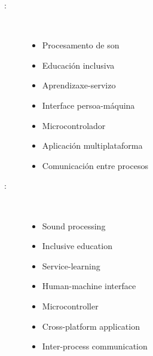 \begin{multicols}{2}
\begin{description}
\item [\palabraschaveprincipal:] \mbox{} \\[-20pt]
  \begin{itemize}
    \item Procesamento de son
    \item Educación inclusiva
    \item Aprendizaxe-servizo
    \item Interface persoa-máquina
    \item Microcontrolador
    \item Aplicación multiplataforma
    \item Comunicación entre procesos
  \end{itemize}
\end{description}
\begin{description}
\item [\palabraschavesecundaria:] \mbox{} \\[-20pt]
\begin{itemize}
  \item Sound processing
  \item Inclusive education
  \item Service-learning
  \item Human-machine interface
  \item Microcontroller
  \item Cross-platform application
  \item Inter-process communication
\end{itemize}

\end{description}
\end{multicols}
